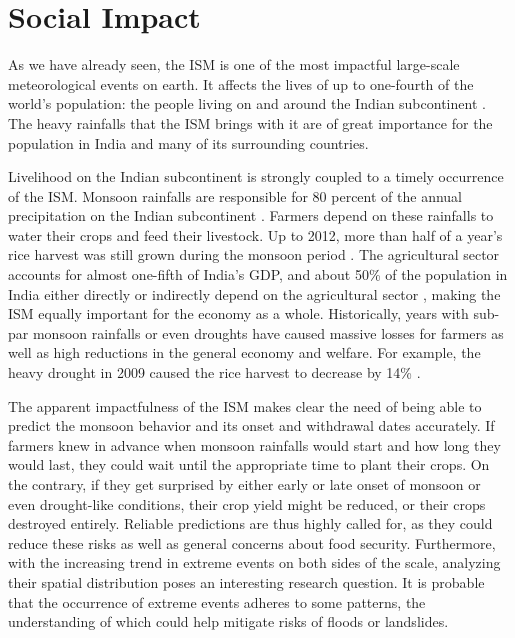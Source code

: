 \section{Social Impact}
\label{st:ism_impact}
As we have already seen, the ISM is one of the most impactful large-scale meteorological events on earth. It affects the lives of up to one-fourth of the world's population: the people living on and around the Indian subcontinent \citep{Stolbova.2015}. The heavy rainfalls that the ISM brings with it are of great importance for the population in India and many of its surrounding countries.

Livelihood on the Indian subcontinent is strongly coupled to a timely occurrence of the ISM. Monsoon rainfalls are responsible for 80 percent of the annual precipitation on the Indian subcontinent \citep{Jin.2017}. Farmers depend on these rainfalls to water their crops and feed their livestock. Up to 2012, more than half of a year's rice harvest was still grown during the monsoon period \citep{Auffhammer.2012}. The agricultural sector accounts for almost one-fifth of India's GDP, and about 50\% of the population in India either directly or indirectly depend on the agricultural sector \citep{CentralIntelligenceAgency.05.01.2018}, making the ISM equally important for the economy as a whole. Historically, years with sub-par monsoon rainfalls or even droughts have caused massive losses for farmers as well as high reductions in the general economy and welfare. For example, the heavy drought in 2009 caused the rice harvest to decrease by 14\% \citep{Auffhammer.2012}.

The apparent impactfulness of the ISM makes clear the need of being able to predict the monsoon behavior and its onset and withdrawal dates accurately. If farmers knew in advance when monsoon rainfalls would start and how long they would last, they could wait until the appropriate time to plant their crops. On the contrary, if they get surprised by either early or late onset of monsoon or even drought-like conditions, their crop yield might be reduced, or their crops destroyed entirely. Reliable predictions are thus highly called for, as they could reduce these risks as well as general concerns about food security. Furthermore, with the increasing trend in extreme events on both sides of the scale, analyzing their spatial distribution poses an interesting research question. It is probable that the occurrence of extreme events adheres to some patterns, the understanding of which could help mitigate risks of floods or landslides.
